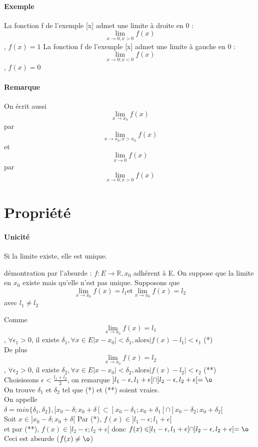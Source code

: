 \paragraph{Exemple}
La fonction f de l'exemple [x] admet une limite à droite en 0 : \[ \lim_{x \to 0 ; x > 0} f(x)\], $f(x) = 1$
La fonction f de l'exemple [x] admet une limite à gauche en 0 : \[ \lim_{x \to 0 ; x < 0} f(x)\], $f(x) = 0$

\paragraph{Remarque} On écrit aussi \[ \lim_{x \to x_0} f(x)\] par \[ \lim_{x \to x_0 ; x > x_0} f(x)\] et ~\\
\[ \lim_{x \to 0} f(x)\] par \[ \lim_{x \to 0 ; x > 0} f(x)\]

\section{Propriété}
\paragraph{Unicité} Si la limite existe, elle est unique.

démontration par l'absurde : $f : E \rightarrow \mathbb{R}, x_0$ adhérent à E. On suppose que la limite en $x_0$ existe mais qu'elle n'est pas unique.
Supposons que \[\lim_{x \to x_0} f(x) = l_1 \text{et} \lim_{x \to x_0} f(x) = l_2\] avec $l_1 \neq l_2$

Comme \[ \lim_{x \to x_0} f(x) = l_1\], $\forall \epsilon_1 > 0$, il existe $\delta_1, \forall x \in E |x-x_0|< \delta_1, \text{alors} |f(x) - l_1| < \epsilon_1$ (*)
~\\
De plus\[ \lim_{x \to x_0} f(x) = l_2\], $\forall \epsilon_2 > 0$, il existe $\delta_2, \forall x \in E |x-x_0|< \delta_2, \text{alors} |f(x) - l_2| < \epsilon_2$ (**)
~\\

Choisissons $\epsilon < \frac{l_1+l_2}{2}$, on remarque $]l_1 - \epsilon, l_1 + \epsilon[ \cap ]l_2 - \epsilon, l_2 + \epsilon[ = \o$
~\\
	On trouve $\delta_1$ et $\delta_2$ tel que (*) et (**) soient vraies.
~\\
On appelle $\delta = min\{\delta_1, \delta_2\}, ]x_0-\delta; x_0+\delta[ \subset ]x_0 - \delta_1; x_0+\delta_1[ \cap ]x_0-\delta_2;x_0+\delta_2[$
~\\

Soit $x \in ]x_0-\delta; x_0+\delta[$ Par (*), $f(x) \in ]l_1-\epsilon; l_1+\epsilon[$
~\\
et par (**), $f(x) \in ]l_2-\epsilon; l_2+\epsilon[$ donc $f(x) \in ]l_1 - \epsilon, l_1 + \epsilon[ \cap ]l_2 - \epsilon, l_2 + \epsilon[ = \o $ Ceci est absurde ($f(x) \neq \o$)
~\\

